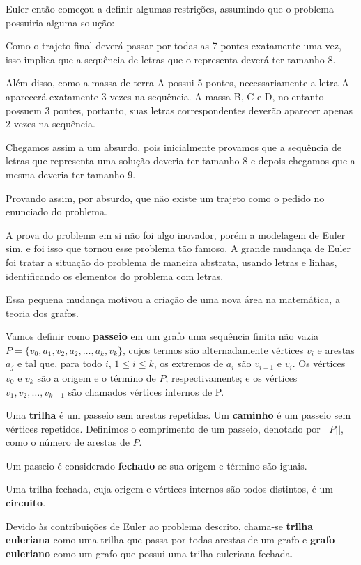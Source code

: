 \documentclass{article}
\begin{document}
Euler então começou a definir algumas restrições, assumindo que o problema possuiria alguma solução:

Como o trajeto final deverá passar por todas as 7 pontes exatamente uma vez, isso implica que a sequência de letras que o representa deverá ter tamanho 8.

Além disso, como a massa de terra A possui 5 pontes, necessariamente a letra A aparecerá exatamente 3 vezes na sequência.
A massa B, C e D, no entanto possuem 3 pontes, portanto, suas letras correspondentes deverão aparecer apenas 2 vezes na sequência. 

Chegamos assim a um absurdo, pois inicialmente provamos que a sequência de letras que representa uma solução deveria ter tamanho 8 e depois chegamos que a mesma deveria ter tamanho 9.

Provando assim, por absurdo, que não existe um trajeto como o pedido no enunciado do problema.


A prova do problema em si não foi algo inovador, porém a modelagem de Euler sim, e foi isso que tornou esse problema tão famoso. 
A grande mudança de Euler foi tratar a situação do problema de maneira abstrata, usando letras e linhas, identificando os elementos do problema com letras. 

Essa pequena mudança motivou a criação de uma nova área na matemática, a teoria dos grafos.



Vamos definir como \textbf{passeio} em um grafo uma sequência finita não vazia $P = \{ v_0, a_1, v_2, a_2, \dots, a_k, v_k\}$, cujos termos são alternadamente vértices $v_i$ e arestas $a_j$ e tal que, para todo $i$, $1 \leq i \leq k$, os extremos de $a_i$ são $v_{i-1}$ e $v_i$. 
Os vértices $v_0$ e $v_k$ são a origem e o término de $P$, respectivamente; e os vértices $v_1, v_2, \dots, v_{k-1}$ são chamados vértices internos de P. 

Uma \textbf{trilha} é um passeio sem arestas repetidas. 
Um \textbf{caminho} é um passeio sem vértices repetidos.
Definimos o comprimento de um passeio, denotado por $||P||$, como o número de arestas de $P$.

Um passeio é considerado \textbf{fechado} se sua origem e término são iguais.

Uma trilha fechada, cuja origem e vértices internos são todos distintos, é um \textbf{circuito}.

Devido às contribuições de Euler ao problema descrito, chama-se \textbf{trilha euleriana} como uma trilha que passa por todas arestas de um grafo e \textbf{grafo euleriano} como um grafo que possui uma trilha euleriana fechada.
\end{document}

